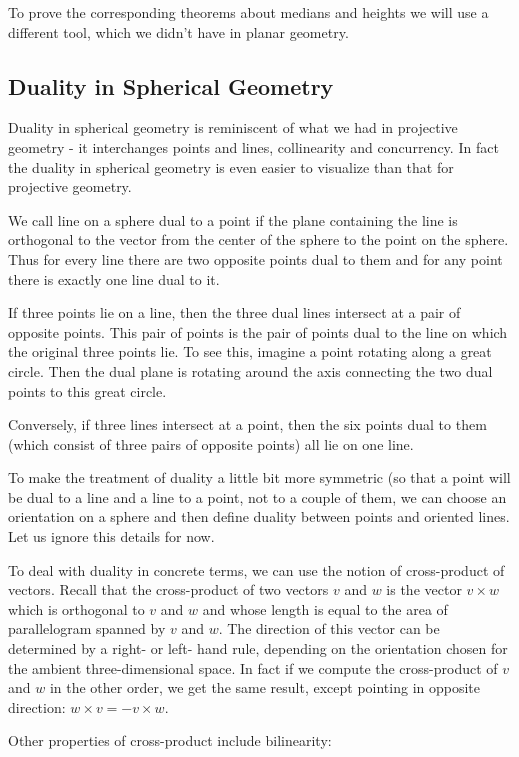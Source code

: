 To prove the corresponding theorems about medians and heights we will use a different tool, which we didn't have in planar geometry.

\subsection{Duality in Spherical Geometry}

Duality in spherical geometry is reminiscent of what we had in projective geometry - it interchanges points and lines, collinearity and concurrency. In fact the duality in spherical geometry is even easier to visualize than that for projective geometry.

We call line on a sphere dual to a point if the plane containing the line is orthogonal to the vector from the center of the sphere to the point on the sphere. Thus for every line there are two opposite points dual to them and for any point there is exactly one line dual to it.

If three points lie on a line, then the three dual lines intersect at a pair of opposite points. This pair of points is the pair of points dual to the line on which the original three points lie. To see this, imagine a point rotating along a great circle. Then the dual plane is rotating around the axis connecting the two dual points to this great circle.

Conversely, if three lines intersect at a point, then the six points dual to them (which consist of three pairs of opposite points) all lie on one line.

To make the treatment of duality a little bit more symmetric (so that a point will be dual to a line and a line to a point, not to a couple of them, we can choose an orientation on a sphere and then define duality between points and oriented lines. Let us ignore this details for now.

To deal with duality in concrete terms, we can use the notion of cross-product of vectors. Recall that the cross-product of two vectors $v$ and $w$ is the vector $v\times w$ which is orthogonal to $v$ and $w$ and whose length is equal to the area of parallelogram spanned by $v$ and $w$. The direction of this vector can be determined by a right- or left- hand rule, depending on the orientation chosen for the ambient three-dimensional space. In fact if we compute the cross-product of $v$ and $w$ in the other order, we get the same result, except pointing in opposite direction: $w\times v=- v\times w$.

Other properties of cross-product include bilinearity:

